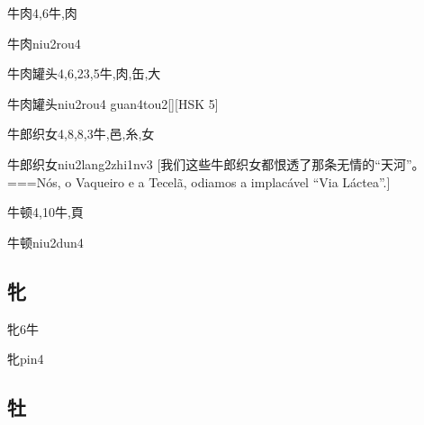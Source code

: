 \begin{Entry}{牛肉}{4,6}{⽜,⾁}
  \begin{Phonetics}{牛肉}{niu2rou4}
  \end{Phonetics}
\end{Entry}

\begin{Entry}{牛肉罐头}{4,6,23,5}{⽜,⾁,⽸,⼤}
  \begin{Phonetics}{牛肉罐头}{niu2rou4 guan4tou2}[][HSK 5]
  \end{Phonetics}
\end{Entry}

\begin{Entry}{牛郎织女}{4,8,8,3}{⽜,⾢,⽷,⼥}
  \begin{Phonetics}{牛郎织女}{niu2lang2zhi1nv3}
    [我们这些牛郎织女都恨透了那条无情的``天河''。===Nós, o Vaqueiro e a Tecelã, odiamos a implacável ``Via Láctea''.]
  \end{Phonetics}
\end{Entry}

\begin{Entry}{牛顿}{4,10}{⽜,⾴}
  \begin{Phonetics}{牛顿}{niu2dun4}
  \end{Phonetics}
\end{Entry}

\subsection*{牝}

\begin{Entry}{牝}{6}{⽜}
  \begin{Phonetics}{牝}{pin4}
  \end{Phonetics}
\end{Entry}

\subsection*{牡}

